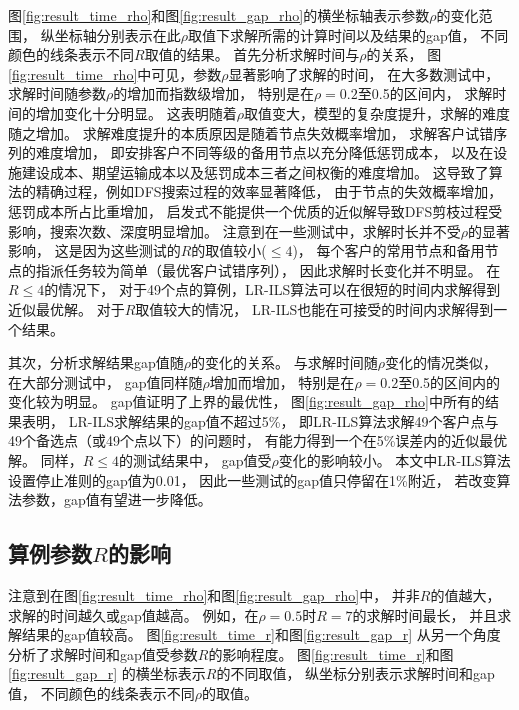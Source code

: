 图\ref{fig:result_time_rho}和图\ref{fig:result_gap_rho}的横坐标轴表示参数$\rho$的变化范围，
纵坐标轴分别表示在此$\rho$取值下求解所需的计算时间以及结果的gap值，
不同颜色的线条表示不同$R$取值的结果。
首先分析求解时间与$\rho$的关系，
图\ref{fig:result_time_rho}中可见，参数$\rho$显著影响了求解的时间，
在大多数测试中，求解时间随参数$\rho$的增加而指数级增加，
特别是在$\rho=0.2$至0.5的区间内，
求解时间的增加变化十分明显。
这表明随着$\rho$取值变大，模型的复杂度提升，求解的难度随之增加。
求解难度提升的本质原因是随着节点失效概率增加，
求解客户试错序列的难度增加，
即安排客户不同等级的备用节点以充分降低惩罚成本，
以及在设施建设成本、期望运输成本以及惩罚成本三者之间权衡的难度增加。
这导致了算法的精确过程，例如DFS搜索过程的效率显著降低，
由于节点的失效概率增加，惩罚成本所占比重增加，
启发式不能提供一个优质的近似解导致DFS剪枝过程受影响，搜索次数、深度明显增加。
注意到在一些测试中，求解时长并不受$\rho$的显著影响，
这是因为这些测试的$R$的取值较小($\le 4$)，
每个客户的常用节点和备用节点的指派任务较为简单（最优客户试错序列），
因此求解时长变化并不明显。
在$R \le 4$的情况下，
对于49个点的算例，LR-ILS算法可以在很短的时间内求解得到近似最优解。
对于$R$取值较大的情况，
LR-ILS也能在可接受的时间内求解得到一个结果。

其次，分析求解结果gap值随$\rho$的变化的关系。
与求解时间随$\rho$变化的情况类似，
在大部分测试中，
gap值同样随$\rho$增加而增加，
特别是在$\rho=0.2$至0.5的区间内的变化较为明显。
gap值证明了上界的最优性，
图\ref{fig:result_gap_rho}中所有的结果表明，
LR-ILS求解结果的gap值不超过5\%，
即LR-ILS算法求解49个客户点与49个备选点（或49个点以下）的问题时，
有能力得到一个在5\%误差内的近似最优解。
同样，$R \le 4$的测试结果中，
gap值受$\rho$变化的影响较小。
本文中LR-ILS算法设置停止准则的gap值为0.01，
因此一些测试的gap值只停留在1\%附近，
若改变算法参数，gap值有望进一步降低。

\subsection{算例参数\texorpdfstring{$R$}{R}的影响}
注意到在图\ref{fig:result_time_rho}和图\ref{fig:result_gap_rho}中，
并非$R$的值越大，求解的时间越久或gap值越高。
例如，在$\rho=0.5$时$R=7$的求解时间最长，
并且求解结果的gap值较高。
图\ref{fig:result_time_r}和图\ref{fig:result_gap_r}
从另一个角度分析了求解时间和gap值受参数$R$的影响程度。
图\ref{fig:result_time_r}和图\ref{fig:result_gap_r}
的横坐标表示$R$的不同取值，
纵坐标分别表示求解时间和gap值，
不同颜色的线条表示不同$\rho$的取值。


